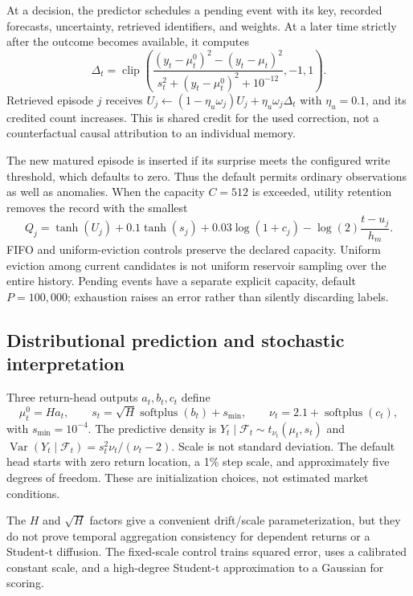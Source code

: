 \documentclass[11pt,a4paper]{article}
\newcommand{\F}{\mathcal F}
\newcommand{\softplus}{\operatorname{softplus}}
\newcommand{\clip}{\operatorname{clip}}
\begin{document}
At a decision, the predictor schedules a pending event with its key, recorded forecasts, uncertainty, retrieved identifiers, and weights. At a later time strictly after the outcome becomes available, it computes
\begin{equation}
\Delta_t=\clip\left(\frac{(y_t-\mu^0_t)^2-(y_t-\mu_t)^2}{s_t^2+(y_t-\mu^0_t)^2+10^{-12}},-1,1\right).
\end{equation}
Retrieved episode $j$ receives $U_j\leftarrow(1-\eta_u\omega_j)U_j+\eta_u\omega_j\Delta_t$ with $\eta_u=0.1$, and its credited count increases. This is shared credit for the used correction, not a counterfactual causal attribution to an individual memory.

The new matured episode is inserted if its surprise meets the configured write threshold, which defaults to zero. Thus the default permits ordinary observations as well as anomalies. When the capacity $C=512$ is exceeded, utility retention removes the record with the smallest
\begin{equation}
Q_j=\tanh(U_j)+0.1\tanh(s_j)+0.03\log(1+c_j)-\log(2)\frac{t-u_j}{h_m}.
\end{equation}
FIFO and uniform-eviction controls preserve the declared capacity. Uniform eviction among current candidates is not uniform reservoir sampling over the entire history. Pending events have a separate explicit capacity, default $P=100{,}000$; exhaustion raises an error rather than silently discarding labels.

\subsection{Distributional prediction and stochastic interpretation}

Three return-head outputs $a_t,b_t,c_t$ define
\begin{equation}
\mu^0_t=Ha_t,\qquad s_t=\sqrt H\softplus(b_t)+s_{\min},\qquad
\nu_t=2.1+\softplus(c_t),
\end{equation}
with $s_{\min}=10^{-4}$. The predictive density is $Y_t\mid\F_t\sim t_{\nu_t}(\mu_t,s_t)$ and $\operatorname{Var}(Y_t\mid\F_t)=s_t^2\nu_t/(\nu_t-2)$. Scale is not standard deviation. The default head starts with zero return location, a 1\% step scale, and approximately five degrees of freedom. These are initialization choices, not estimated market conditions.

The $H$ and $\sqrt H$ factors give a convenient drift/scale parameterization, but they do not prove temporal aggregation consistency for dependent returns or a Student-t diffusion. The fixed-scale control trains squared error, uses a calibrated constant scale, and a high-degree Student-t approximation to a Gaussian for scoring.
\end{document}
